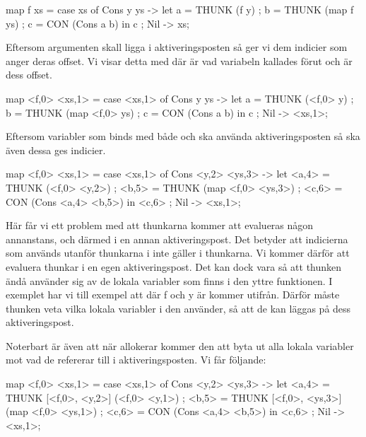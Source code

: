 \documentclass[../Core]{subfiles}
\begin{document}

\begin{codeEx}
map f xs = case xs of
    { Cons y ys -> let
        { a = THUNK (f y)
        ; b = THUNK (map f ys)
        ; c = CON (Cons a b)
        } in c
    ; Nil -> xs};
\end{codeEx}

Eftersom argumenten skall ligga i aktiveringsposten så ger vi dem indicier som anger deras 
offset. Vi visar detta med  där  är vad variabeln kallades 
förut och  är dess offset.

\begin{codeEx}
map <f,0> <xs,1> = case <xs,1> of
    { Cons y ys -> let
        { a = THUNK (<f,0> y)
        ; b = THUNK (map <f,0> ys)
        ; c = CON (Cons a b)
        } in c
    ; Nil -> <xs,1>};
\end{codeEx}


Eftersom variabler som binds med både  och  
ska använda aktiveringsposten så ska även dessa ges indicier.

\begin{codeEx}
map <f,0> <xs,1> = case <xs,1> of
    { Cons <y,2> <ys,3> -> let
        { <a,4> = THUNK (<f,0> <y,2>)
        ; <b,5> = THUNK (map <f,0> <ys,3>)
        ; <c,6> = CON (Cons <a,4> <b,5>)
        } in <c,6>
    ; Nil -> <xs,1>};
\end{codeEx}

Här får vi ett problem med att thunkarna kommer att evalueras någon 
annanstans, och därmed i en annan aktiveringspost. Det betyder att indicierna som 
används utanför thunkarna i  inte gäller i thunkarna. Vi kommer därför att evaluera
thunkar i en egen aktiveringspost. Det kan dock vara så att thunken ändå använder sig
av de lokala variabler som finns i den yttre funktionen. I exemplet har vi till exempel att 
 där f och y är kommer utifrån. Därför 
måste thunken veta vilka lokala variabler i  den använder, så att de kan
läggas på dess aktiveringspost. 

Noterbart är även att när  allokerar kommer den att byta ut alla lokala variabler
mot vad de refererar till i aktiveringsposten. Vi får följande: 


\begin{codeEx}
map <f,0> <xs,1> = case <xs,1> of
    { Cons <y,2> <ys,3> -> let
        { <a,4> = THUNK [<f,0>, <y,2>]  (<f,0> <y,1>)
        ; <b,5> = THUNK [<f,0>, <ys,3>] (map <f,0> <ys,1>)
        ; <c,6> = CON (Cons <a,4> <b,5>)
        } in <c,6>
    ; Nil -> <xs,1>};
\end{codeEx}
\end{document}
